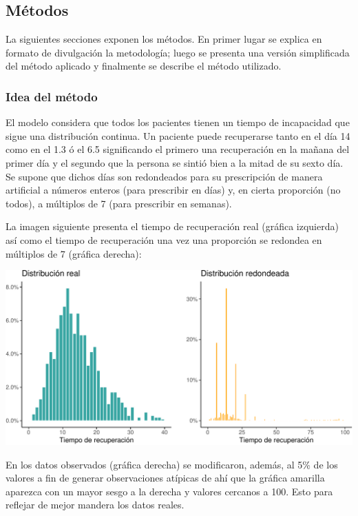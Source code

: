 \documentclass[
]{article}
\begin{document}
\hypertarget{muxe9todos}{%
\subsection{Métodos}\label{muxe9todos}}

La siguientes secciones exponen los métodos. En primer lugar se explica
en formato de divulgación la metodología; luego se presenta una versión
simplificada del método aplicado y finalmente se describe el método
utilizado.

\hypertarget{idea-del-muxe9todo}{%
\subsubsection{Idea del método}\label{idea-del-muxe9todo}}

El modelo considera que todos los pacientes tienen un tiempo de
incapacidad que sigue una distribución continua. Un paciente puede
recuperarse tanto en el día 14 como en el 1.3 ó el 6.5 significando el
primero una recuperación en la mañana del primer día y el segundo que la
persona se sintió bien a la mitad de su sexto día. Se supone que dichos
días son redondeados para su prescripción de manera artificial a números
enteros (para prescribir en días) y, en cierta proporción (no todos), a
múltiplos de 7 (para prescribir en semanas).

La imagen siguiente presenta el tiempo de recuperación real (gráfica
izquierda) así como el tiempo de recuperación una vez una proporción se
redondea en múltiplos de 7 (gráfica derecha):

\begin{center}\includegraphics{Nota_Metodologica_v1_files/figure-latex/unnamed-chunk-1-1} \end{center}

En los datos observados (gráfica derecha) se modificaron, además, al 5\%
de los valores a fin de generar observaciones atípicas de ahí que la
gráfica amarilla aparezca con un mayor sesgo a la derecha y valores
cercanos a 100. Esto para reflejar de mejor mandera los datos reales.
\end{document}
